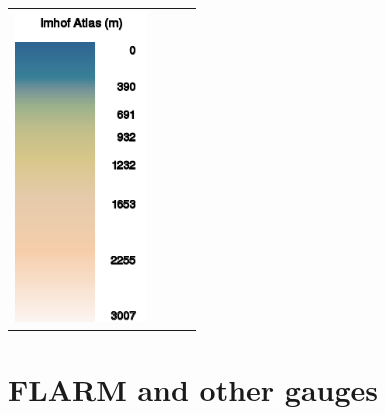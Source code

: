\begin{maxipage}
\begin{longtable}{c c c c}
\includegraphics[angle=0,width=3.5cm,keepaspectratio='true']{figures/ramp-terrain-imhofatlas.png}
\\
\end{longtable}
\end{maxipage}


\clearpage
\section{FLARM and other gauges} \label{sec:vario-gauge}


